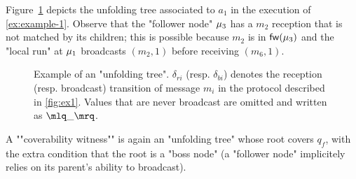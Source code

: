 \begin{example}
	Figure~\ref{fig:ex-unfolding-tree} depicts the unfolding tree associated to $a_1$ in the execution of \cref{ex:example-1}. 
	Observe that the "follower node" $\mu_3$ has a $m_2$ reception that is not matched by its children; this is possible because $m_2$ is in $\mathsf{fw}(\mu_3)$ and the "local run" at $\mu_1$ broadcasts $(m_2,1)$ before receiving $(m_6,1)$.  
\end{example}
\begin{figure}[t]
	\begin{center}
					
		\end{center}
	\vspace*{-0.5cm}
	\caption{Example of an "unfolding tree". $\delta_{ri}$ (resp. $\delta_{bi}$) denotes the reception (resp. broadcast) transition of message $m_i$ in the protocol described in \cref{fig:ex1}. Values that are never broadcast are omitted and written as $\quotemarks{\_}$.}\label{fig:ex-unfolding-tree}
\end{figure}

A ""coverability witness"" is again an "unfolding tree" whose root covers $q_f$, with the extra condition that the root is a "boss node" (a "follower node" implicitely relies on its parent's ability to broadcast). 

